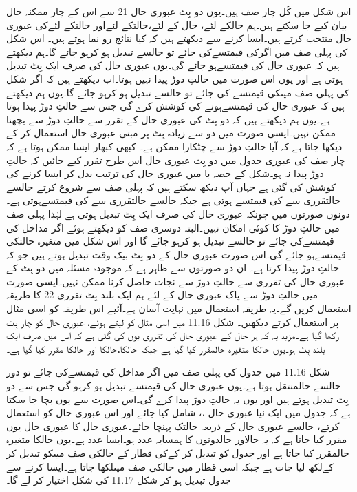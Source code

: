 	اس شکل میں کُل چار صف ہیں۔یوں دو بِٹ عبوری حال  21 سے اس کے چار ممکنہ حال بیان کیے جا سکتے ہیں۔ہم حالکے لئے، حال کے لئے،حالتکے لئےاور حالتکے لئےکی عبوری حال  منتخب کرتے ہیں۔ایسا کرنے سے دیکھتے ہیں کہ کیا نتائج رو نما ہوتے ہیں۔
	اس شکل کی پہلی صف میں اگرکی قیمتسےکی جائے تو حالسے تبدیل ہو کرہو جائے گا۔ہم دیکھتے ہیں کہ عبوری حال کی قیمتسےہو جائے گی۔یوں عبوری حال  کی صرف ایک بِٹ تبدیل ہوتی ہے اور یوں اس صورت میں حالتِ دوڑ پیدا نہیں ہوتا۔اب دیکھتے ہیں کہ اگر شکل کی پہلی صف میںکی قیمتسے کی جائے تو حالسے تبدیل ہو کرہو جائے گا۔یوں ہم دیکھتے ہیں کہ عبوری حال کی قیمتسےہونے کی کوشش کرے گی جس سے حالتِ دوڑ پیدا ہوتا ہے۔یوں ہم دیکھتے ہیں کہ دو بِٹ کی عبوری حال  کے تقرر سے حالتِ دوڑ سے بچھنا ممکن نہیں۔ایسی صورت میں دو سے زیادہ بِٹ پر مبنی عبوری حال  استعمال کر کے دیکھا جاتا ہے کہ آیا حالتِ دوڑ سے چٹکارا ممکن ہے۔
	کبھی کبھار ایسا ممکن ہوتا ہے کہ چار صف کی عبوری جدول میں دو بِٹ عبوری حال  اس طرح تقرر کیے جائیں کہ حالتِ دوڑ پیدا نہ ہو۔شکل کے حصہ با میں عبوری حال  کی ترتیب بدل کر ایسا کرنے کی کوشش کی گئی ہے جہاں آپ دیکھ سکتے ہیں کہ پہلی صف سے شروع کرتے حالسے حالتقرری سے کی قیمتسے ہوتی ہے جبکہ حالسے حالتقرری سے کی قیمتسےہوتی ہے۔دونوں صورتوں میں چونکہ عبوری حال  کی صرف ایک بِٹ تبدیل ہوتی ہے لہٰذا پہلی صف میں حالتِ دوڑ کا کوئی امکان نہیں۔البتہ دوسری صف کو دیکھتے ہوئے اگر مداخل کی قیمتسےکی جائے تو حالسے تبدیل ہو کرہو جائے گا اور اس شکل میں متغیرہ حالتکی قیمتسےہو جائے گی۔اس صورت عبوری حال  کے دو بِٹ بیک وقت تبدیل ہوتے ہیں جو کہ حالتِ دوڑ پیدا کرتا ہے۔
	ان دو صورتوں سے ظاہر ہے کہ موجودہ مسئلہ میں دو بِٹ کے عبوری حال  کی تقرری سے حالتِ دوڑ سے نجات حاصل کرنا ممکن نہیں۔ایسی صورت میں حالتِ دوڑ سے پاک عبوری حال  کے لئے ہم ایک بلند بِٹ تقرری 22 کا طریقہ استعمال کریں گے۔یہ طریقہ استعمال میں نہایت آسان ہے۔آئیے اس طریقہ کو اسی مثال پر استعمال کرتے دیکھیں۔
	شکل 11.16 میں اسی مثال کو لیتے ہوئے، عبوری حال  کو چار بِٹ رکھا گیا ہے۔مزید یہ کہ ہر حال کے عبوری حال  کی تقرری یوں کی گئی ہے کہ اس میں صرف ایک بلند بِٹ ہو۔یوں حالکا متغیرہ حالمقرر کیا گیا ہے جبکہ حالکا،حالکا  اور حالکا مقرر کیا گیا ہے۔


	شکل 11.16 میں جدول کی پہلی صف میں اگر مداخل کی قیمتسےکی جائے تو دور حالسے حالمنتقل ہوتا ہے۔یوں عبوری حال  کی قیمتسے تبدیل ہو کرہو گی جس سے دو بِٹ تبدیل ہوتے ہیں اور یوں یہ حالتِ دوڑ پیدا کرے گی۔اس صورت سے یوں بچا جا سکتا ہے کہ جدول میں ایک نیا عبوری حال ،، شامل کیا جائے اور اس عبوری حال  کو استعمال کرتے، حالسے عبوری حال کے ذریعہ حالتک پہنچا جائے۔عبوری حال کا عبوری حال  یوں مقرر کیا جاتا ہے کہ یہ حالاور حالدونوں کا ہمسایہ عدد ہو۔ایسا عدد ہے۔یوں حالکا متغیرہ حالمقرر کیا جاتا ہے اور جدول کو تبدیل کر کےکی قطار کے حالکی صف میںکو تبدیل کر کےلکھ لیا جات ہے جبکہ اسی قطار میں حالکی صف میںلکھا جاتا ہے۔ایسا کرنے سے جدول تبدیل ہو کر شکل 11.17 کی شکل اختیار کر لے گا۔


